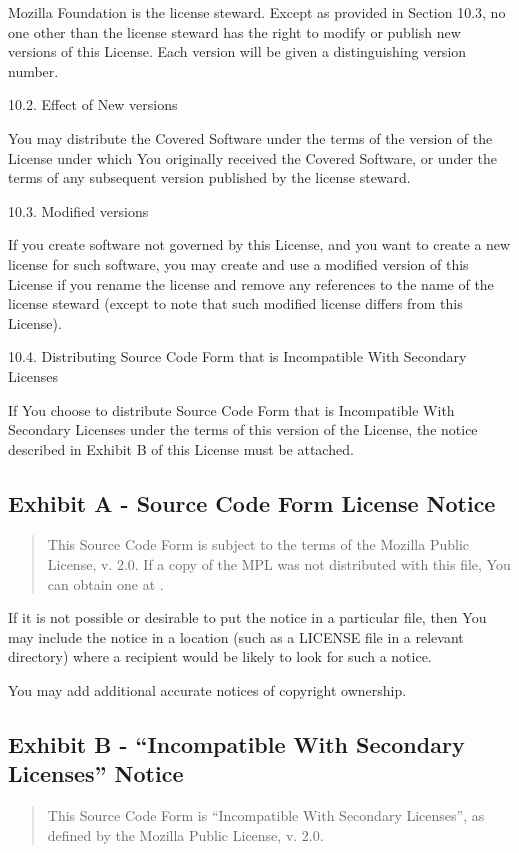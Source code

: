 \documentclass[letterpaper,10pt,english]{sphinxmanual}
\begin{document}
Mozilla Foundation is the license steward. Except as provided in Section
10.3, no one other than the license steward has the right to modify or
publish new versions of this License. Each version will be given a
distinguishing version number.

10.2. Effect of New versions

You may distribute the Covered Software under the terms of the version
of the License under which You originally received the Covered Software,
or under the terms of any subsequent version published by the license
steward.

10.3. Modified versions

If you create software not governed by this License, and you want to
create a new license for such software, you may create and use a
modified version of this License if you rename the license and remove
any references to the name of the license steward (except to note that
such modified license differs from this License).

10.4. Distributing Source Code Form that is Incompatible With Secondary
Licenses

If You choose to distribute Source Code Form that is Incompatible With
Secondary Licenses under the terms of this version of the License, the
notice described in Exhibit B of this License must be attached.


\subsection{Exhibit A - Source Code Form License Notice}
\label{\detokenize{warranty:exhibit-a-source-code-form-license-notice}}\begin{quote}

This Source Code Form is subject to the terms of the Mozilla Public
License, v. 2.0. If a copy of the MPL was not distributed with this
file, You can obtain one at .
\end{quote}

If it is not possible or desirable to put the notice in a particular
file, then You may include the notice in a location (such as a LICENSE
file in a relevant directory) where a recipient would be likely to look
for such a notice.

You may add additional accurate notices of copyright ownership.


\subsection{Exhibit B - “Incompatible With Secondary Licenses” Notice}
\label{\detokenize{warranty:exhibit-b-incompatible-with-secondary-licenses-notice}}\begin{quote}

This Source Code Form is “Incompatible With Secondary Licenses”, as
defined by the Mozilla Public License, v. 2.0.
\end{quote}
\end{document}
